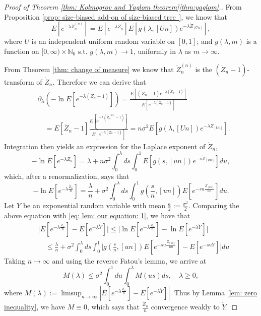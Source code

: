 \documentclass[12pt,a4paper]{amsart}
\numberwithin{equation}{section}
\begin{document}
\begin{proof}[Proof of Theorem \ref{thm: Kolmogrov and Yaglom theorem}\eqref{thm:yaglom}.]
	From Proposition \ref{prop: size-biased add-on of size-biased tree }, we know that
	\[
	E [ e^{- \lambda \ddot Z_n^{(n)}} ]
	= E [e^{-\lambda \dot Z_n}] E[g(\lambda, [Un])e^{-\lambda \dot Z_{[Un]}}],
	\]
	where $U$ is an independent uniform random variable on $[0,1]$; and $g(\lambda, m)$ is a function on $[0,\infty) \times \mathbb N_0$ s.t.
	$g(\lambda, m) \to 1$, uniformly in $\lambda$ as $m\to \infty$.
	
	From Theorem \ref{thm: change of measure} we know that $\ddot Z_n^{(n)}$ is the $(\dot Z_n - 1)$-transform of $\dot Z_n$.
	Therefore we can derive that
\[\begin{split}
	&\partial_\lambda (-\ln E[e^{-\lambda (\dot Z_n-1)}])
	= \frac{E[(\dot Z_n-1) e^{-\lambda (\dot Z_n-1)}]}{E[e^{-\lambda (\dot Z_n-1)}]}
	\\&\quad = E[\dot Z_n - 1] \frac{E[ e^{-\lambda (\ddot Z^{(n)}_n-1)}]}{E[e^{-\lambda (\dot Z_n-1)}]}
	= n\sigma^2 E[g(\lambda, [Un])e^{-\lambda \dot Z_{[Un]}}].
\end{split}\]
	Integration then yields an expression for the Laplace exponent of $\dot Z_n$,
\[
	- \ln E[ e^{- \lambda \dot Z_n}]
	= \lambda + n \sigma^2 \int_0^\lambda ds \int_0^1 E[g(s, [un]) e^{-s \dot Z_{[un]}}] du,
\]
	which, after a renormalization, says that
\[
	- \ln E[ e^{- \lambda \frac{\dot Z_n}{n}}]
	= \frac{\lambda}{n} + \sigma^2 \int_0^\lambda ds \int_0^1 g(\frac{s}{n}, [un]) E[e^{-su \frac{\dot Z_{[un]}}{un}}] du.
\]
	Let $Y$ be an exponential random variable with mean $\frac{a}{2}:=\frac{\sigma^2}{2}$. 
	Comparing the above equation with \eqref{eq: lem: our equation: 1}, we have that
\[\begin{split}
	&\big| E[e^{-\lambda \frac{\dot Z_n}{n}}] - E[e^{-\lambda \dot Y}]\big| 
	\leq \big| \ln E[e^{-\lambda \frac{\dot Z_n}{n}}] - \ln E[e^{-\lambda \dot Y}]\big| 
	\\&\quad \leq \frac{\lambda }{n} + \sigma^2 \int_0^\lambda ds \int_0^1 \big| g(\frac{s}{n}, [un]) E[e^{-su \frac { Z_{[un]} } {un} }] - E[e^{- su \dot Y}]\big| du 
\end{split}\]
Taking $n\to \infty$ and using the reverse Fatou's lemma, we arrive at
\[
	M(\lambda)
	\leq \sigma^2 \int_0^1du \int_0^\lambda M(us)ds,
	\quad \lambda\geq 0,
\]
	where 
$M(\lambda) := \limsup_{n\to \infty} | E[ e^{- \lambda \frac{\dot Z_n }{n}}] - E[e^{-\lambda \dot Y}]|$. 
	Thus by Lemma \ref{lem: zero inequality}, we have $M \equiv 0$, which says that $\frac{\dot Z_n}{n}$ convergence weakly to $\dot Y$.


\end{proof}
\end{document}
